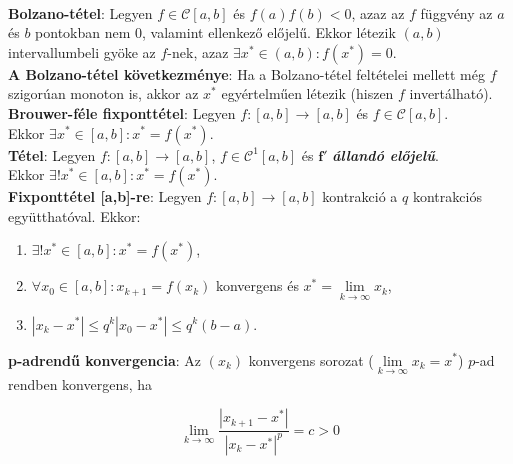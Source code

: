 \documentclass[tikz,12pt,margin=0px]{article}
\newcommand\ddfrac[2]{\frac{\displaystyle #1}{\displaystyle #2}}
\begin{document}
    {\footnotesize \noindent {\color{blue} \faLightbulbO\ $\triangleright$ } }
    {\footnotesize\\	
	\noindent \textbf{Bolzano-tétel}: Legyen $f \in \mathcal{C}[a,b]$ és $f(a)f(b) <0$, azaz az $f$ függvény az $a$ és $b$
	pontokban nem $0$, valamint ellenkező előjelű. Ekkor létezik $(a,b)$ intervallumbeli gyöke az $f$-nek, azaz
	$\exists x^{*} \in (a,b): f(x^{*}) = 0$.\\
	
	\noindent \textbf{A Bolzano-tétel következménye}: Ha a Bolzano-tétel feltételei mellett még $f$ szigorúan monoton is, akkor
	az $x^{*}$ egyértelműen létezik (hiszen $f$ invertálható).\\
	
	\noindent \textbf{Brouwer-féle fixponttétel}: Legyen $f : [a,b] \to [a,b]$ és $f \in \mathcal{C}[a,b]$.\\

    \noindent Ekkor $\exists
	 x^{*} \in [a,b]: x^{*} = f(x^{*})$.\\
	
	\noindent \textbf{Tétel}: Legyen $f : [a,b] \to [a,b]$, $f \in \mathcal{C}^{1}[a,b]$ és $\boldsymbol{f'}$ \emph{\textbf{állandó előjelű}}.\\

    \noindent Ekkor $\exists\boldsymbol{!}
	x^{*} \in [a,b]: x^{*} = f(x^{*})$.\\
	
	\noindent \textbf{Fixponttétel [a,b]-re}: Legyen $f : [a,b] \to [a,b]$ kontrakció a $q$ kontrakciós együtthatóval.
	Ekkor:
	
	\begin{enumerate}
		\item	$\exists! x^{*} \in [a,b]: x^{*} = f(x^{*})$,
		
		\item	$\forall x_{0} \in [a,b]: x_{k+1} = f(x_{k})$ konvergens és $x^{*} = \lim\limits_{k \to \infty} x_{k}$,
		
		\item	$| x_{k} - x^{*} | \leq q^{k} | x_{0} - x^{*}| \leq q^{k}(b-a)$.
	\end{enumerate}
	
	\noindent \textbf{p-adrendű konvergencia}: Az $(x_{k})$ konvergens sorozat ($\lim\limits_{k \to \infty} x_{k} = x^{*}$)
	$p$-ad rendben konvergens, ha
	
	\begin{displaymath}
		\lim\limits_{k \to \infty} \ddfrac{|x_{k+1} - x^{*}|}{|x_{k}-x^{*}|^{p}} = c > 0
	\end{displaymath}
	
}
\end{document}
